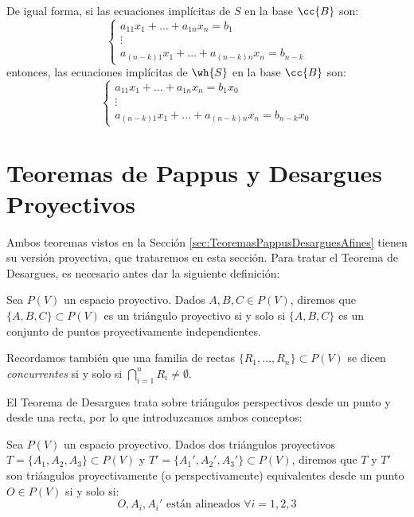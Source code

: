 De igual forma, si las ecuaciones implícitas de $S$ en la base $\cc{B}$ son:
\begin{equation*}
    \left\{
        \begin{array}{c}
            a_{11}x_1 + \dots + a_{1n}x_n = b_1\\
            \vdots\\
            a_{(n-k)1}x_1 + \dots + a_{(n-k)n}x_n = b_{n-k}
        \end{array}
    \right.
\end{equation*}
entonces, las ecuaciones implícitas de $\wh{S}$ en la base $\cc{B}$ son:
\begin{equation*}
    \left\{
        \begin{array}{c}
            a_{11}x_1 + \dots + a_{1n}x_n = b_1x_0\\
            \vdots\\
            a_{(n-k)1}x_1 + \dots + a_{(n-k)n}x_n = b_{n-k}x_0            
        \end{array}
    \right.
\end{equation*}




\section{Teoremas de Pappus y Desargues Proyectivos}

Ambos teoremas vistos en la Sección \ref{sec:TeoremasPappusDesarguesAfines}
tienen su versión proyectiva, que trataremos en esta sección. Para tratar el Teorema
de Desargues, es necesario antes dar la siguiente definición:
\begin{definicion}
    Sea $P(V)$ un espacio proyectivo.
    Dados $A,B,C \in {P}(V)$, diremos que $\{A,B,C\}\subset P(V)$ es un triángulo proyectivo si y solo si
    $\{A,B,C\}$ es un conjunto de puntos proyectivamente independientes.
\end{definicion}

Recordamos también que una familia de rectas $\{R_1,\dots,R_n\}\subset P(V)$ se dicen
\emph{concurrentes} si y solo si $\bigcap\limits_{i=1}^n R_i \neq \emptyset$.

El Teorema de Desargues trata sobre triángulos perspectivos desde un punto y desde una recta, por lo que introduzcamos ambos conceptos:
\begin{definicion}
    Sea $P(V)$ un espacio proyectivo.
    Dados dos triángulos proyectivos $T = \{A_1, A_2, A_3\}\subset P(V)$ y $T' = \{A_1', A_2', A_3'\}\subset P(V)$,
    diremos que $T$ y $T'$ son triángulos proyectivamente (o perspectivamente) equivalentes desde un punto $O \in P(V)$ si y solo si:
    \begin{equation*}
        O, A_i, A_i' \text{ están alineados } \forall i=1,2,3
    \end{equation*}
\end{definicion}

